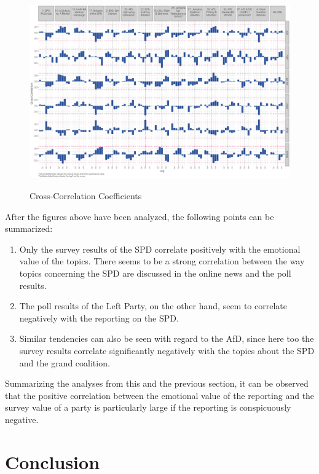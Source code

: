 \documentclass[12pt,a4paper,notitlepage]{article}
\begin{document}
\begin{landscape}
\begin{figure}[H]
	\caption{Cross-Correlation Coefficients}
	\begin{center}
			\includegraphics[width=1.3\textwidth,keepaspectratio]{figs/ccf2.png}
			\label{fig_ccf}
	\end{center}
\end{figure} 
\end{landscape}

After the figures above have been analyzed, the following points can be summarized:

\begin{enumerate}
	\item Only the survey results of the SPD correlate positively with the emotional value of the topics. There seems to be a strong correlation between the way topics concerning the SPD are discussed in the online news and the poll results.  
	\item The poll results of the Left Party, on the other hand, seem to correlate negatively with the reporting on the SPD. 
	\item Similar tendencies can also be seen with regard to the AfD, since here too the survey results correlate significantly negatively with the topics about the SPD and the grand coalition. 
\end{enumerate} 

Summarizing the analyses from this and the previous section, it can be observed that the positive correlation between the emotional value of the reporting and the survey value of a party is particularly large if the reporting is conspicuously negative. 

\section{Conclusion}
\end{document}
